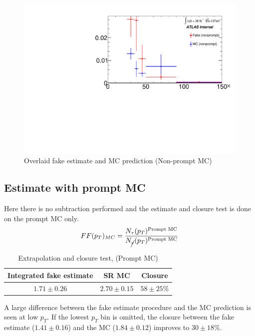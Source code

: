 \documentclass[11pt]{article}
\begin{document}
	\begin{figure}[H]
		\centering
		\includegraphics[width=0.7\linewidth]{figures/FakesEstimate_data_pp8_nonallhad_new_scaledHists/Overlay_FF_tau_pt_nonprompt.pdf}
		\caption{Overlaid fake estimate and MC prediction (Non-prompt MC)}
	\end{figure}	
		




	\clearpage
	\subsection{Estimate with prompt MC} 
	Here there is no subtraction performed and the estimate and closure test is done on the prompt MC only. 
	\begin{equation}
		FF(p_T)_{MC} = \frac{N_\tau (p_T)^{\text{Prompt MC}}}{N_{\cancel{\tau}} (p_T)^{\text{Prompt MC}}}
	\end{equation}

	\begin{table}[htp]
	\caption{Extrapolation and closure test, (Prompt MC)}
	\begin{center}
	\begin{tabular}{|c|c|c|}
	\hline
	Integrated fake estimate	& SR MC	& Closure \\
	\hline
	$1.71\pm0.26$ 		& $2.70\pm0.15$ 		& $58\pm25$\% \\
	\hline
	\end{tabular}
	\end{center}
	\label{default}
	\end{table}%
	
	A large difference between the fake estimate procedure and the MC prediction is seen at low $p_T$. If the lowest $p_T$ bin is omitted, the closure between the fake estimate ($1.41\pm0.16$) and the MC ($1.84\pm0.12$) improves to $30\pm18$\%. 
		
\end{document}
